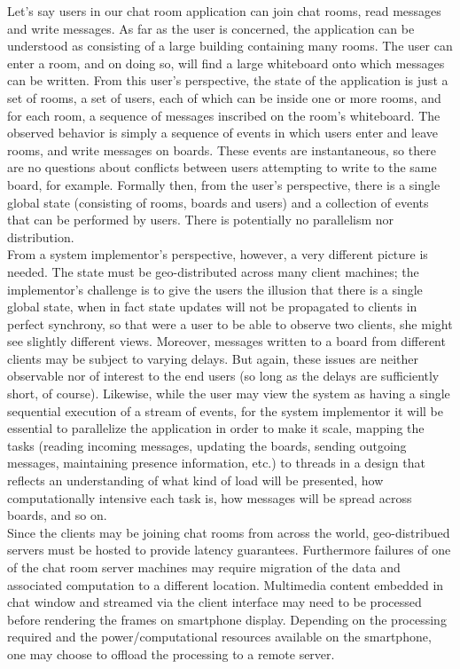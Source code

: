 \documentclass[a4paper]{article}
\begin{document}
Let's say users in our chat room application can join chat rooms, read messages and write messages. As far as the user is concerned, the application can be understood as consisting of a large building containing many rooms. The user can enter a room, and on doing so, will find a large whiteboard onto which messages can be written. From this user’s perspective, the state of the application is just a set of rooms, a set of users, each of which can be inside one or more rooms, and for each room, a sequence of messages inscribed on the room’s whiteboard. The observed behavior is simply a sequence of events in which users enter and leave rooms, and write messages on boards. These events are instantaneous, so there are no questions about conflicts between users attempting to write to the same board, for example. Formally then, from the user’s perspective, there is a single global state (consisting of rooms, boards and users) and a collection of events that can be performed by users. There is potentially no parallelism nor distribution.\\ 

From a system implementor’s perspective, however, a very different picture is needed. The state must be geo-distributed across many client machines; the implementor’s challenge is to give the users the illusion
that there is a single global state, when in fact state updates will not be propagated to clients in perfect synchrony, so that were a user to be able to observe two clients, she might see slightly different views.
Moreover, messages written to a board from different clients may be subject to varying delays. But again, these issues are neither observable nor of interest to the end users (so long as the delays are sufficiently short, of course). Likewise, while the user may view the system as having a single sequential execution of a stream of events, for the system implementor it will be essential to parallelize the application in order to make it scale, mapping the tasks (reading incoming messages, updating the boards, sending outgoing messages, maintaining presence information, etc.) to threads in a design that reflects an understanding of what kind
of load will be presented, how computationally intensive each task is, how messages will be spread across boards, and so on. \\ 

Since the clients may be joining chat rooms from across the world, geo-distribued servers must be hosted to provide latency guarantees. Furthermore failures of one of the chat room server machines may require migration of the data and associated computation to a different location. Multimedia content embedded in chat window and streamed via the client interface may need to be processed before rendering the frames on smartphone display. Depending on the processing required and the power/computational resources available on the smartphone, one may choose to offload the processing to a remote server. \\
\end{document}
